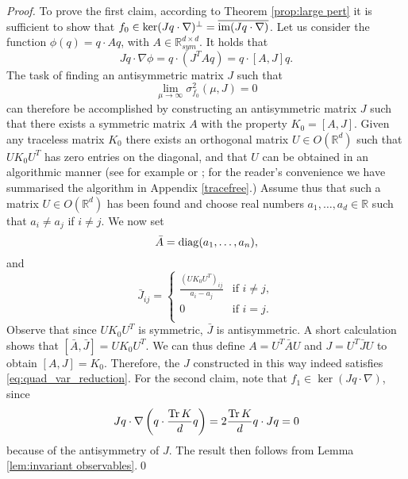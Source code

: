 \begin{proof}
	To prove the first claim, according to Theorem \ref{prop:large pert}
	it is sufficient to show that $f_{0}\in\ker(Jq\cdot\nabla)^{\perp}=\overline{\operatorname{im}(Jq\cdot\nabla)}$.
	Let us consider the function $\phi(q)=q\cdot Aq$, with $A\in\mathbb{R}_{sym}^{d\times d}$. It holds that
	\begin{equation*}
	Jq\cdot\nabla\phi=q\cdot(J^{T}Aq)=q\cdot[A,J]q.
	\end{equation*}
	The task of finding an antisymmetric matrix $J$ such that 
	\begin{equation}
	\label{eq:quad_var_reduction}
	\lim_{\mu\rightarrow\infty}\sigma_{f_{0}}^{2}(\mu,J)=0
	\end{equation}
	can therefore be accomplished by constructing an antisymmetric matrix
	$J$ such that there exists a symmetric matrix $A$ with the property
	$K_{0}=[A,J]$.  Given any traceless matrix $K_{0}$ there exists
	an orthogonal matrix $U\in O(\mathbb{R}^{d})$ such that $UK_{0}U^{T}$
	has zero entries on the diagonal, and that $U$ can be obtained in
	an algorithmic manner (see for example \cite{alg_zero_diag} or \cite[Chapter 2, Section 2, Problem 3]{Horn_Johnson_Matrix_Analysis}; for the reader's convenience we have summarised the algorithm in Appendix \ref{tracefree}.) Assume
	thus that such a matrix $U\in O(\mathbb{R}^{d})$ has been found and choose real numbers $a_1,\ldots,a_d \in \mathbb{R}$ such that $a_{i}\neq a_{j}$ if $i\neq j$.
	We now set
	\begin{equation}
	\bar{A}=\operatorname{diag}(a_{1},\ldots,a_{n}),
	\end{equation}
	and 
	\begin{equation}
	\bar{J}_{ij}= 
	\begin{cases}
	\frac{(UK_{0}U^{T})_{ij}}{a_{i}-a_{j}} & \text{if } i\neq j, \\
	0 & \text{if } i=j. \\ 
	\end{cases}
	\end{equation}
	Observe that since $UK_{0}U^{T}$ is symmetric, $\bar{J}$ is antisymmetric. 
	A short calculation shows that $[\bar{A},\bar{J}]= UK_{0}U^{T}$.
	We can thus define $A=U^{T}\bar{A}U$ and $J=U^{T}\bar{J}U$ to obtain $[A,J]=K_0$. Therefore, the $J$ constructed in this way indeed satisfies \eqref{eq:quad_var_reduction}.  For the second claim, note that $f_{1}\in\ker(Jq\cdot\nabla)$, since
	\begin{equation}
	\label{eq:constant_trace}
	Jq\cdot\nabla\left(q\cdot\frac{\operatorname{Tr} K}{d}q\right)=2\frac{\operatorname{Tr} K}{d}q\cdot Jq=0
	\end{equation}
	because of the antisymmetry of $J$. The result then follows from
	Lemma \ref{lem:invariant observables}.\qed
\end{proof}
